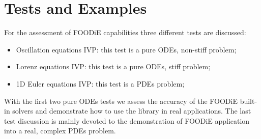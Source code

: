 \section{Tests and Examples}\label{sec:Tests}

For the assessment of FOODiE capabilities three different tests are discussed:

\begin{itemize}
  \item Oscillation equations IVP: this test is a pure ODEs, non-stiff problem;
  \item Lorenz equations IVP: this test is a pure ODEs, stiff problem;
  \item 1D Euler equations IVP: this test is a PDEs problem;
  \end{itemize}

With the first two pure ODEs tests we assess the accuracy of the FOODiE built-in solvers and demonstrate how to use the library in real applications. The last test discussion is mainly devoted to the demonstration of FOODiE application into a real, complex PDEs problem.


